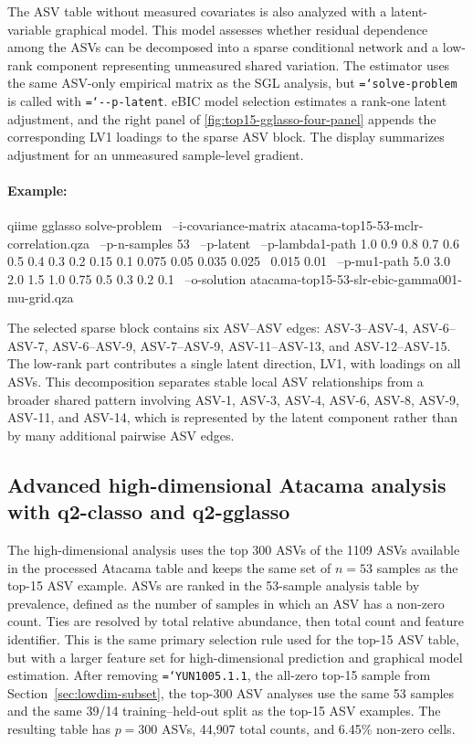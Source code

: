 \documentclass[11pt,a4paper]{article}
\newcommand{\code}[1]{\allowbreak\texttt{\hyphenchar\font=`\-\relax #1}}
\begin{document}
The ASV table without measured covariates is also analyzed with a
latent-variable graphical model. This model assesses whether residual
dependence among the ASVs can be decomposed into a sparse conditional network and
a low-rank component representing unmeasured shared variation. The estimator uses
the same ASV-only empirical matrix as the SGL analysis, but \code{solve-problem}
is called with \code{-{}-p-latent}. eBIC model selection estimates a rank-one
latent adjustment, and the right panel of
\autoref{fig:top15-gglasso-four-panel} appends the corresponding LV1 loadings to
the sparse ASV block.
The display summarizes adjustment for an unmeasured sample-level gradient.

\paragraph{Example:} \mbox{}
\begin{PseudoCode}
qiime gglasso solve-problem \
    --i-covariance-matrix atacama-top15-53-mclr-correlation.qza \
    --p-n-samples 53 \
    --p-latent \
    --p-lambda1-path 1.0 0.9 0.8 0.7 0.6 0.5 0.4 0.3 0.2 0.15 0.1 0.075 0.05 0.035 0.025 \
        0.015 0.01 \
    --p-mu1-path 5.0 3.0 2.0 1.5 1.0 0.75 0.5 0.3 0.2 0.1 \
    --o-solution atacama-top15-53-slr-ebic-gamma001-mu-grid.qza
\end{PseudoCode}

The selected sparse block contains six ASV--ASV edges: ASV-3--ASV-4,
ASV-6--ASV-7, ASV-6--ASV-9, ASV-7--ASV-9, ASV-11--ASV-13, and ASV-12--ASV-15.
The low-rank part contributes a single latent direction, LV1, with loadings on
all ASVs. This decomposition separates stable local ASV relationships from a
broader shared pattern involving ASV-1, ASV-3, ASV-4, ASV-6, ASV-8, ASV-9,
ASV-11, and ASV-14, which is represented by the latent component rather than by
many additional pairwise ASV edges.

\clearpage
\subsection{Advanced high-dimensional Atacama analysis with q2-classo and q2-gglasso}
\label{sec:highdim-subset}
\label{sec:highdim}

The high-dimensional analysis uses the top 300 ASVs of the 1109 ASVs available in the processed
Atacama table and keeps the same set of $n=53$ samples as the top-15 ASV
example. ASVs are ranked in the 53-sample analysis
table by prevalence, defined as the number of samples in which an ASV has a
non-zero count. Ties are resolved by total relative abundance, then total count
and feature identifier. This is the same primary selection rule used for the
top-15 ASV table, but with a larger feature set for high-dimensional prediction
and graphical model estimation. After removing \code{YUN1005.1.1}, the all-zero
top-15 sample from Section~\ref{sec:lowdim-subset}, the top-300 ASV analyses
use the same 53 samples and the same 39/14 training--held-out split as the
top-15 ASV examples. The resulting table has $p=300$ ASVs, 44{,}907 total
counts, and 6.45\% non-zero cells.
\end{document}
